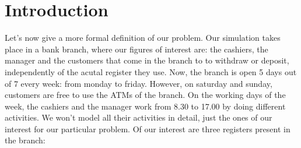 \documentclass{article}
\begin{document}
\section{Introduction}

Let's now give a more formal definition of our problem. Our simulation takes place in a bank branch, where our figures of interest are: the cashiers, the manager and the customers that come in the branch to to withdraw or deposit, independently of the acutal register they use. Now, the branch is open 5 days out of 7 every week: from monday to friday. However, on saturday and sunday, customers are free to use the ATMs of the branch. On the working days of the week, the cashiers and the manager work from 8.30 to 17.00 by doing different activities. We won't model all their activities in detail, just the ones of our interest for our particular problem.
\newline
Of our interest are three registers present in the branch:
\end{document}
